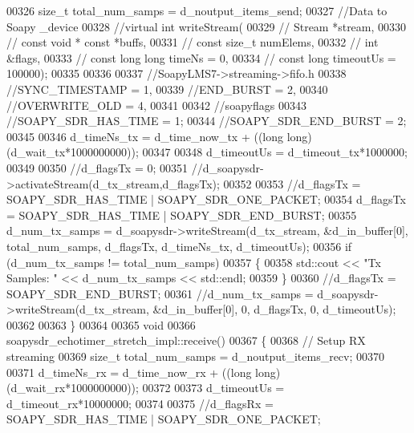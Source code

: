 \begin{DoxyCode}
00326       \textcolor{keywordtype}{size\_t} total\_num\_samps = d_noutput_items_send;
00327       \textcolor{comment}{//Data to Soapy \_device}
00328       \textcolor{comment}{//virtual int writeStream(}
00329       \textcolor{comment}{//        Stream *stream,}
00330       \textcolor{comment}{//        const void * const *buffs,}
00331       \textcolor{comment}{//        const size\_t numElems,}
00332       \textcolor{comment}{//        int &flags,}
00333       \textcolor{comment}{//        const long long timeNs = 0,}
00334       \textcolor{comment}{//        const long timeoutUs = 100000);}
00335 
00336 
00337       \textcolor{comment}{//SoapyLMS7->streaming->fifo.h}
00338       \textcolor{comment}{//SYNC\_TIMESTAMP = 1,}
00339       \textcolor{comment}{//END\_BURST = 2,}
00340       \textcolor{comment}{//OVERWRITE\_OLD = 4,}
00341 
00342       \textcolor{comment}{//soapyflags}
00343       \textcolor{comment}{//SOAPY\_SDR\_HAS\_TIME = 1;}
00344       \textcolor{comment}{//SOAPY\_SDR\_END\_BURST = 2;}
00345 
00346       d_timeNs_tx = d_time_now_tx + ((\textcolor{keywordtype}{long} long) (d_wait_tx*1000000000));
00347 
00348       d_timeoutUs = d_timeout_tx*1000000;
00349 
00350       \textcolor{comment}{//d\_flagsTx = 0;}
00351       \textcolor{comment}{//d\_soapysdr->activateStream(d\_tx\_stream,d\_flagsTx);}
00352 
00353       \textcolor{comment}{//d\_flagsTx =  SOAPY\_SDR\_HAS\_TIME  | SOAPY\_SDR\_ONE\_PACKET;}
00354       d_flagsTx =  SOAPY_SDR_HAS_TIME | SOAPY_SDR_END_BURST;
00355       d_num_tx_samps = d_soapysdr->writeStream(d_tx_stream, &d_in_buffer[0], total\_num\_samps, 
      d_flagsTx, d_timeNs_tx, d\_timeoutUs);
00356       \textcolor{keywordflow}{if} (d_num_tx_samps != total\_num\_samps)
00357       \{
00358         std::cout << \textcolor{stringliteral}{"Tx Samples: "} << d_num_tx_samps << std::endl;
00359       \}
00360       \textcolor{comment}{//d\_flagsTx = SOAPY\_SDR\_END\_BURST;}
00361       \textcolor{comment}{//d\_num\_tx\_samps = d\_soapysdr->writeStream(d\_tx\_stream, &d\_in\_buffer[0], 0, d\_flagsTx, 0,
       d\_timeoutUs);}
00362 
00363     \}
00364 
00365     \textcolor{keywordtype}{void}
00366     soapysdr_echotimer_stretch_impl::receive()
00367     \{
00368       \textcolor{comment}{// Setup RX streaming}
00369       \textcolor{keywordtype}{size\_t} total\_num\_samps = d_noutput_items_recv;
00370 
00371       d_timeNs_rx = d_time_now_rx + ((\textcolor{keywordtype}{long} long)(d_wait_rx*1000000000));
00372 
00373       d_timeoutUs = d_timeout_rx*10000000;
00374 
00375       \textcolor{comment}{//d\_flagsRx =  SOAPY\_SDR\_HAS\_TIME | SOAPY\_SDR\_ONE\_PACKET;}

\end{DoxyCode}
